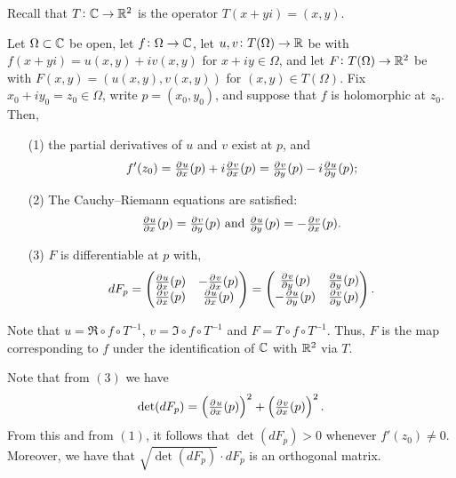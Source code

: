 \documentclass[11pt,a4paper]{article}
\begin{document}
Recall that $T \colon \mathbb{C} \to \mathbb{R}^2$ is the operator $T(x + y i) = (x,y)$.

\begin{proposition}
  \label{prop:pd}
  Let $\Omega \subset \mathbb{C}$ be open, let $f \colon \Omega \to \mathbb{C}$, let 
  $u,v \colon T(\Omega) \to \mathbb{R}$ be with $f(x + y i) = u(x,y) + i v(x,y)$
  for $x + i y \in \Omega$, and let $F \colon T(\Omega) \to \mathbb{R}^2$ be with
  $F(x,y) = (u(x,y), v(x,y))$ for $(x,y) \in T(\Omega)$.
  Fix $x_0 + i y_0 = z_0 \in \Omega$,
  write $p = (x_0, y_0)$, and suppose that $f$ is holomorphic at $z_0$.
  Then,
  \begin{enumerate}
    \item[(1)] the partial derivatives of $u$ and $v$ exist at $p$, and
      \[
        f'(z_0) =
        \pd{u}{x}(p) + i \pd{v}{x}(p) =
        \pd{v}{y}(p) - i \pd{u}{y}(p);
      \]
    \item[(2)] The Cauchy--Riemann equations are satisfied:
      \[
        \pd{u}{x}(p) = \pd{v}{y}(p) \stand
        \pd{u}{y}(p) = -\pd{v}{x}(p).
      \]
    \item[(3)] $F$ is differentiable at $p$ with,
      \[
        dF_p =
        \begin{pmatrix}
          \pd{u}{x}(p) & - \pd{v}{x}(p) \\
          \pd{v}{x}(p) & \pd{u}{x}(p) 
        \end{pmatrix} =
        \begin{pmatrix}
          \pd{v}{y}(p) & \pd{u}{y}(p) \\
          - \pd{u}{y}(p) & \pd{v}{y}(p) 
        \end{pmatrix}.
      \]
  \end{enumerate}
\end{proposition}

\begin{remark}
  Note that $u = \Re \circ f \circ T^{-1}$, $v = \Im \circ f \circ T^{-1}$
  and $F = T \circ f \circ T^{-1}$.
  Thus, $F$ is the map corresponding to $f$ under the identification of $\mathbb{C}$ 
  with $\mathbb{R}^2$ via $T$.
\end{remark}

\begin{remark}
  Note that from $(3)$ we have
  \[
    \det(dF_p) = \del{\pd{u}{x}(p)}^2 + \del{\pd{v}{x}(p)}^2.
  \]
  From this and from $(1)$, it follows that $\det(dF_p) > 0$ whenever
  $f'(z_0) \neq 0$.
  Moreover, we have that $\sqrt{\det(dF_p)} \cdot dF_p$ is an orthogonal
  matrix.
\end{remark}
\end{document}
